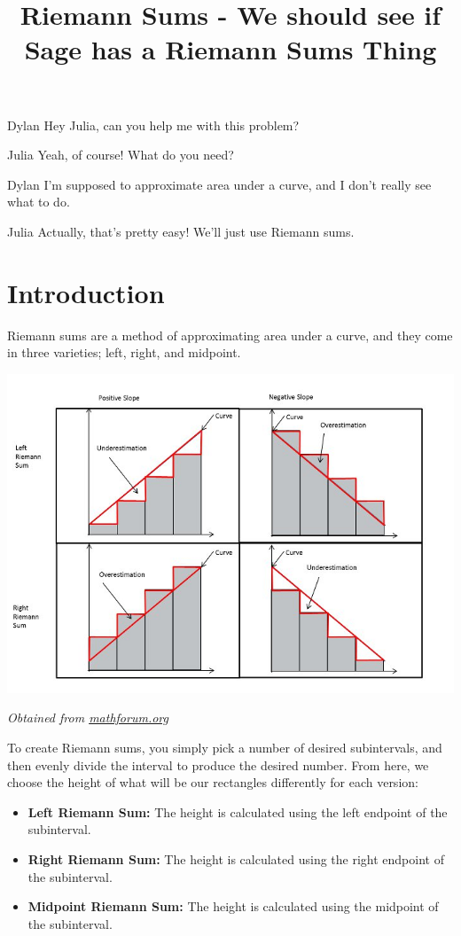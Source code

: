 \documentclass{ximera}
\title{Riemann Sums - We should see if Sage has a Riemann Sums Thing}
\begin{document}
\maketitle
\begin{dialogue}
\item[Dylan] Hey Julia, can you help me with this problem?
\item[Julia] Yeah, of course! What do you need?
\item[Dylan] I'm supposed to approximate area under a curve, and I don't really see what to do.
\item[Julia] Actually, that's pretty easy! We'll just use Riemann sums.
\end{dialogue}

\section{Introduction}
Riemann sums are a method of approximating area under a curve, and they come in three varieties; left, right, and midpoint.

\begin{image}
\includegraphics{Table}
\end{image}
\begin{center}
\textit{Obtained from \href{http://mathforum.org/mathimages/index.php/Riemann_Sums}{mathforum.org}}
\end{center}


To create Riemann sums, you simply pick a number of desired subintervals, and then evenly divide the interval to produce the desired number. From here, we choose the height of what will be our rectangles differently for each version:
\begin{itemize}
\item{\textbf{Left Riemann Sum:} The height is calculated using the left endpoint of the subinterval.}
\item{\textbf{Right Riemann Sum:} The height is calculated using the right endpoint of the subinterval.}
\item{\textbf{Midpoint Riemann Sum:} The height is calculated using the midpoint of the subinterval.}
\end{itemize}
\end{document}
